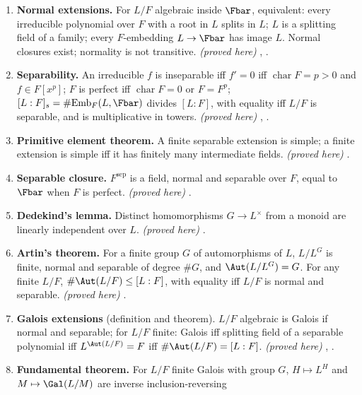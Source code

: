 \begin{enumerate}[label=\textbf{\thechapter.\arabic*}]
of splitting fields of $f$ and $\phi(f)$, in at most $[L:F]$ ways, exactly $[L:F]$ if $f$ is separable. \emph{(proved here; families of polynomials
sketched)} .
\item \textbf{Normal extensions.} For $L/F$ algebraic inside $\Fbar$, equivalent: every irreducible polynomial over $F$ with a root in $L$ splits in $L$;
$L$ is a splitting field of a family; every $F$-embedding $L\to\Fbar$ has image $L$. Normal closures exist; normality is not transitive.
\emph{(proved here)} , .
\item \textbf{Separability.} An irreducible $f$ is inseparable iff $f'=0$ iff $\operatorname{char}F=p>0$ and $f\in F[x^p]$; $F$ is perfect iff
$\operatorname{char}F=0$ or $F=F^p$; $[L:F]_s=\#\mathrm{Emb}_F(L,\Fbar)$ divides $[L:F]$, with equality iff $L/F$ is separable, and is multiplicative in towers.
\emph{(proved here)} , .
\item \textbf{Primitive element theorem.} A finite separable extension is simple; a finite extension is simple iff it has finitely many intermediate fields.
\emph{(proved here)} .
\item \textbf{Separable closure.} $F^{\mathrm{sep}}$ is a field, normal and separable over $F$, equal to $\Fbar$ when $F$ is perfect.
\emph{(proved here)} .
\item \textbf{Dedekind's lemma.} Distinct homomorphisms $G\to L^\times$ from a monoid are linearly independent over $L$. \emph{(proved here)} .
\item \textbf{Artin's theorem.} For a finite group $G$ of automorphisms of $L$, $L/L^G$ is finite, normal and separable of degree $\#G$, and
$\Aut(L/L^G)=G$. For any finite $L/F$, $\#\Aut(L/F)\le[L:F]$, with equality iff $L/F$ is normal and separable. \emph{(proved here)} .
\item \textbf{Galois extensions} (definition and theorem). $L/F$ algebraic is Galois if normal and separable; for $L/F$ finite: Galois iff splitting field
of a separable polynomial iff $L^{\Aut(L/F)}=F$ iff $\#\Aut(L/F)=[L:F]$. \emph{(proved here)} , .
\item \textbf{Fundamental theorem.} For $L/F$ finite Galois with group $G$, $H\mapsto L^H$ and $M\mapsto\Gal(L/M)$ are inverse inclusion-reversing

\end{enumerate}
